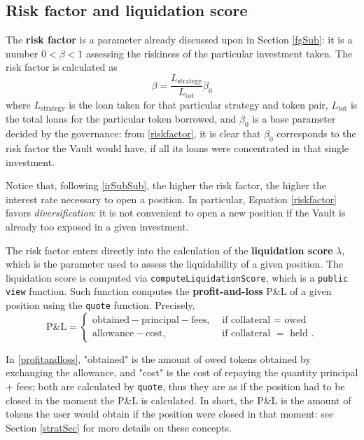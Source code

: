 \documentclass[a4paper,10 pt]{article}
\theoremstyle{definition}
\begin{document}
\subsection{Risk factor and liquidation score}\label{rflsSub}

The {\bf risk factor} is a parameter already discussed upon in Section \ref{fgSub}: it is a number $0 < \beta < 1$ assessing the riskiness of the particular investment taken. The risk factor is calculated as
\begin{equation}\label{riskfactor}
\beta = \frac{L_{\text{strategy}}}{L_{\text{tot}}}\beta_0
\end{equation}
where $L_{\text{strategy}}$ is the loan taken for that particular strategy and token pair, $L_{\text{tot}}$ is the total loans for the particular token borrowed, and $\beta_0$ is a base parameter decided by the governance: from \eqref{riskfactor}, it is clear that $\beta_0$ corresponds to the risk factor the Vault would have, if all its loans were concentrated in that single investment.

Notice that, following \ref{irSubSub}, the higher the risk factor, the higher the interest rate necessary to open a position. In particular, Equation \eqref{riskfactor} favors {\it diversification}: it is not convenient to open a new position if the Vault is already too exposed in a given investment.

The risk factor enters directly into the calculation of the {\bf liquidation score} $\lambda$, which is the parameter used to assess the liquidability of a given position. The liquidation score is computed via \verb|computeLiquidationScore|, which is a \verb|public view| function. Such function computes the {\bf profit-and-loss} P\&L of a given position using the \verb|quote| function. Precisely,
\begin{equation}\label{profitandloss}
\text{P\&L} = \begin{cases}
\text{obtained} - \text{principal} - \text{fees}, & \text{ if collateral } = \text{ owed } \\
\text{allowance} - \text{cost}, & \text{ if collateral } = \text{ held }.
\end{cases}
\end{equation}

In \eqref{profitandloss}, "obtained" is the amount of owed tokens obtained by exchanging the allowance, and "cost" is the cost of repaying the quantity principal + fees; both are calculated by \verb|quote|, thus they are as if the position had to be closed in the moment the P\&L is calculated. In short, the P\&L is the amount of tokens the user would obtain if the position were closed in that moment: see Section \ref{stratSec} for more details on these concepts.
\end{document}
